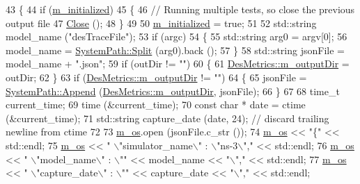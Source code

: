 \begin{DoxyCode}
43 \{
44   \textcolor{keywordflow}{if} (\hyperlink{classns3_1_1DesMetrics_a229b920334708658e4d3b5ebf5e24c4c}{m\_initialized})
45     \{
46       \textcolor{comment}{// Running multiple tests, so close the previous output file}
47       \hyperlink{classns3_1_1DesMetrics_a17b52dbb23cd230d64404f57f59029c5}{Close} ();
48     \}
49 
50   \hyperlink{classns3_1_1DesMetrics_a229b920334708658e4d3b5ebf5e24c4c}{m\_initialized} = \textcolor{keyword}{true};
51 
52   std::string model\_name (\textcolor{stringliteral}{"desTraceFile"});
53   \textcolor{keywordflow}{if} (argc)
54     \{
55       std::string arg0 = argv[0];
56       model\_name = \hyperlink{group__systempath_ga523072e05da63b63113d1bea840edf1a}{SystemPath::Split} (arg0).back ();
57     \}
58   std::string jsonFile = model\_name + \textcolor{stringliteral}{".json"};
59   \textcolor{keywordflow}{if} (outDir != \textcolor{stringliteral}{""})
60     \{
61       \hyperlink{classns3_1_1DesMetrics_affd6e3b6d411b401491d711506734d75}{DesMetrics::m\_outputDir} = outDir;
62     \}
63   \textcolor{keywordflow}{if} (\hyperlink{classns3_1_1DesMetrics_affd6e3b6d411b401491d711506734d75}{DesMetrics::m\_outputDir} != \textcolor{stringliteral}{""})
64     \{
65       jsonFile = \hyperlink{group__systempath_gaaa5a530cee42c8eda7e4f4523ef7e1cd}{SystemPath::Append} (\hyperlink{classns3_1_1DesMetrics_affd6e3b6d411b401491d711506734d75}{DesMetrics::m\_outputDir}, 
      jsonFile);
66     \}
67 
68   time\_t current\_time;
69   time (&current\_time);
70   \textcolor{keyword}{const} \textcolor{keywordtype}{char} * date = ctime (&current\_time);
71   std::string capture\_date (date, 24);  \textcolor{comment}{// discard trailing newline from ctime}
72 
73   \hyperlink{classns3_1_1DesMetrics_ae84cea9d7b1c24d810e741bd8c46b430}{m\_os}.open (jsonFile.c\_str ());
74   \hyperlink{classns3_1_1DesMetrics_ae84cea9d7b1c24d810e741bd8c46b430}{m\_os} << \textcolor{stringliteral}{"\{"} << std::endl;
75   \hyperlink{classns3_1_1DesMetrics_ae84cea9d7b1c24d810e741bd8c46b430}{m\_os} << \textcolor{stringliteral}{" \(\backslash\)"simulator\_name\(\backslash\)" : \(\backslash\)"ns-3\(\backslash\)","} << std::endl;
76   \hyperlink{classns3_1_1DesMetrics_ae84cea9d7b1c24d810e741bd8c46b430}{m\_os} << \textcolor{stringliteral}{" \(\backslash\)"model\_name\(\backslash\)" : \(\backslash\)""} << model\_name << \textcolor{stringliteral}{"\(\backslash\)","} << std::endl;
77   \hyperlink{classns3_1_1DesMetrics_ae84cea9d7b1c24d810e741bd8c46b430}{m\_os} << \textcolor{stringliteral}{" \(\backslash\)"capture\_date\(\backslash\)" : \(\backslash\)""} << capture\_date << \textcolor{stringliteral}{"\(\backslash\)","} << std::endl;

\end{DoxyCode}
